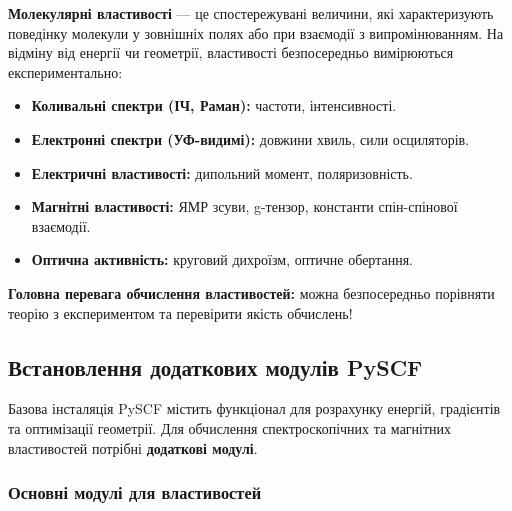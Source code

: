 \textbf{Молекулярні властивості} --- це спостережувані величини, які
характеризують поведінку молекули у зовнішніх полях або при взаємодії
з випромінюванням. На відміну від енергії чи геометрії, властивості
безпосередньо вимірюються експериментально:

\begin{itemize}
    \item \textbf{Коливальні спектри (ІЧ, Раман):} частоти, інтенсивності.
    \item \textbf{Електронні спектри (УФ-видимі):} довжини хвиль, сили осциляторів.
    \item \textbf{Електричні властивості:} дипольний момент, поляризовність.
    \item \textbf{Магнітні властивості:} ЯМР зсуви, g-тензор, константи спін-спінової взаємодії.
    \item \textbf{Оптична активність:} круговий дихроїзм, оптичне обертання.
\end{itemize}

\textbf{Головна перевага обчислення властивостей:} можна безпосередньо
порівняти теорію з експериментом та перевірити якість обчислень!

\subsection*{Встановлення додаткових модулів PySCF}

Базова інсталяція PySCF містить функціонал для розрахунку енергій,
градієнтів та оптимізації геометрії. Для обчислення спектроскопічних
та магнітних властивостей потрібні \textbf{додаткові модулі}.

\subsubsection*{Основні модулі для властивостей}

